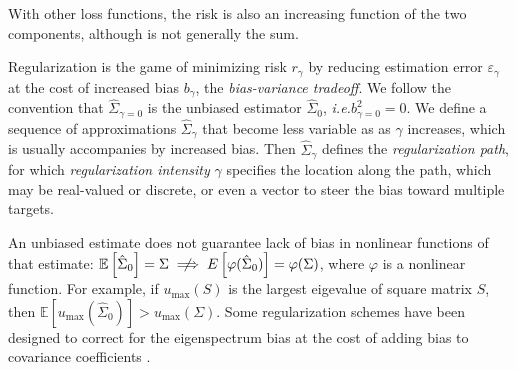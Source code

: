 With other loss functions, the risk is also an increasing function of the two components, although is not generally the sum.

Regularization is the game of minimizing risk $r_\gamma$ by reducing estimation error $\varepsilon_\gamma$ at the cost of increased bias $b_\gamma$, the \emph{bias-variance tradeoff}.  
We follow the convention that $\hat\Sigma_{\gamma=0}$ is the unbiased estimator $\hat\Sigma_0$, \emph{i.e.}\;$b_{\gamma=0}^2 = 0$. 
We define a sequence of approximations $\hat\Sigma_\gamma$ that become less variable as as $\gamma$ increases, which is usually accompanies by increased bias. Then $\hat\Sigma_\gamma$ defines the \emph{regularization path}, for which \emph{regularization intensity} $\gamma$ specifies the location along the path, which may be real-valued or discrete, or even a vector to steer the bias toward multiple targets.  

An unbiased estimate does not guarantee lack of bias in nonlinear functions of that estimate: $\mathbb E\left[\hat\Sigma_0\right]=\Sigma \centernot\implies  E\left[\varphi(\hat\Sigma_0)\right]=\varphi(\Sigma)$, where $\varphi$ is a nonlinear function. For example, if $u_{\max}(S)$ is the largest eigevalue of square matrix $S$, then $\mathbb E\left[u_{\max}(\hat\Sigma_0)\right] > u_{\max}(\Sigma)$. Some regularization schemes have been designed to correct for the eigenspectrum bias  at the cost of adding bias to covariance coefficients \citep{Ledoit:2004}.

